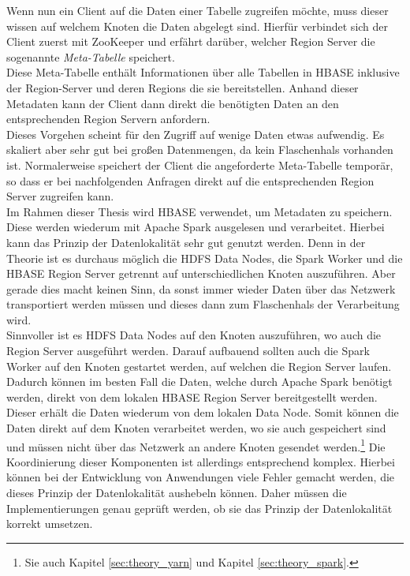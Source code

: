 \noindent
Wenn nun ein Client auf die Daten einer Tabelle zugreifen möchte, muss dieser wissen auf welchem Knoten die Daten abgelegt sind. Hierfür verbindet sich der Client zuerst mit ZooKeeper und erfährt darüber, welcher Region Server die sogenannte \textit{Meta-Tabelle} speichert.\cite[S. 579]{hadoop_definitive_guide}\\
Diese Meta-Tabelle enthält Informationen über alle Tabellen in HBASE inklusive der Region-Server und deren Regions die sie bereitstellen. Anhand dieser Metadaten kann der Client dann direkt die benötigten Daten an den entsprechenden Region Servern anfordern.\\
Dieses Vorgehen scheint für den Zugriff auf wenige Daten etwas aufwendig. Es skaliert aber sehr gut bei großen Datenmengen, da kein Flaschenhals vorhanden ist. Normalerweise speichert der Client die angeforderte Meta-Tabelle temporär, so dass er bei nachfolgenden Anfragen direkt auf die entsprechenden Region Server zugreifen kann.\\ 

\noindent
Im Rahmen dieser Thesis wird HBASE verwendet, um Metadaten zu speichern. Diese werden wiederum mit Apache Spark ausgelesen und verarbeitet. Hierbei kann das Prinzip der Datenlokalität sehr gut genutzt werden. Denn in der Theorie ist es durchaus möglich die HDFS Data Nodes, die Spark Worker und die HBASE Region Server getrennt auf unterschiedlichen Knoten auszuführen. Aber gerade dies macht keinen Sinn, da sonst immer wieder Daten über das Netzwerk transportiert werden müssen und dieses dann zum Flaschenhals der Verarbeitung wird.\\
Sinnvoller ist es HDFS Data Nodes auf den Knoten auszuführen, wo auch die Region Server ausgeführt werden. Darauf aufbauend sollten auch die Spark Worker auf den Knoten gestartet werden, auf welchen die Region Server laufen. Dadurch können im besten Fall die Daten, welche durch Apache Spark benötigt werden, direkt von dem lokalen HBASE Region Server bereitgestellt werden. Dieser erhält die Daten wiederum von dem lokalen Data Node. Somit können die Daten direkt auf dem Knoten verarbeitet werden, wo sie auch gespeichert sind und müssen nicht über das Netzwerk an andere Knoten gesendet werden.\footnote{Sie auch Kapitel \ref{sec:theory_yarn} und Kapitel \ref{sec:theory_spark}.} Die Koordinierung dieser Komponenten ist allerdings entsprechend komplex. Hierbei können bei der Entwicklung von Anwendungen viele Fehler gemacht werden, die dieses Prinzip der Datenlokalität aushebeln können. Daher müssen die Implementierungen genau geprüft werden, ob sie das Prinzip der Datenlokalität korrekt umsetzen.\\

